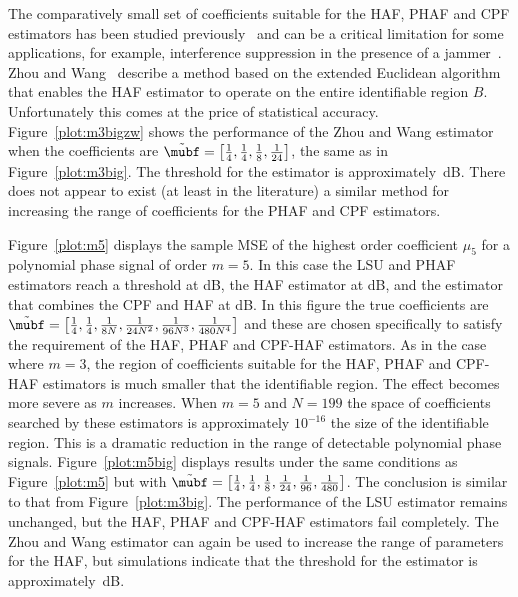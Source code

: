 \documentclass[journal]{IEEEtran}
\begin{document}
The comparatively small set of coefficients suitable for the HAF, PHAF and CPF estimators has been studied previously~\cite{Angeby_PPS_aliasing_2000,Djurovic_aliasing_2012,McKilliam2009IndentifiabliltyAliasingPolyphase,Zhou_lag_diverity_PPT_1997,Xia_dynamic_range_pps_2001,Morelande_bayes_unwrapping_2009_tsp} and can be a critical limitation for some applications, for example, interference suppression in the presence of a jammer~\cite{Djukanovic:2011:PMN:1950994.1951252,Djurovic_aliasing_2012}.  Zhou and Wang~\cite{Zhou_lag_diverity_PPT_1997} describe a method based on the extended Euclidean algorithm that enables the HAF estimator to operate on the entire identifiable region $B$.  Unfortunately this comes at the price of statistical accuracy.  Figure~\ref{plot:m3bigzw} shows the performance of the Zhou and Wang estimator when the coefficients are $\tilde{\mubf} = \left[ \tfrac{1}{4}, \tfrac{1}{4}, \tfrac{1}{8}, \tfrac{1}{24}  \right]$, the same as in Figure~\ref{plot:m3big}.  The threshold for the estimator is approximately~\unit[28]{dB}.  There does not appear to exist (at least in the literature) a similar method for increasing the range of coefficients for the PHAF and CPF estimators.

Figure~\ref{plot:m5} displays the sample MSE of the highest order coefficient $\mu_5$  for a polynomial phase signal of order $m=5$.  In this case the LSU and PHAF estimators reach a threshold at \unit[12]{dB}, the HAF estimator at \unit[18]{dB}, and the estimator that combines the CPF and HAF at \unit[10]{dB}.  In this figure the true coefficients are $\tilde{\mubf} = \left[ \tfrac{1}{4}, \tfrac{1}{4}, \tfrac{1}{8N}, \tfrac{1}{24N^2}, \tfrac{1}{96N^3}, \tfrac{1}{480N^4}  \right]$ and these are chosen specifically to satisfy the requirement of the HAF, PHAF and CPF-HAF estimators.  As in the case where $m=3$, the region of coefficients suitable for the HAF, PHAF and CPF-HAF estimators is much smaller that the identifiable region.  The effect becomes more severe as $m$ increases.  When $m=5$ and $N=199$ the space of coefficients searched by these estimators is approximately $10^{-16}$ the size of the identifiable region.  This is a dramatic reduction in the range of detectable polynomial phase signals. Figure~\ref{plot:m5big} displays results under the same conditions as Figure~\ref{plot:m5} but with $\tilde{\mubf} = \left[ \tfrac{1}{4}, \tfrac{1}{4}, \tfrac{1}{8}, \tfrac{1}{24}, \tfrac{1}{96}, \tfrac{1}{480}  \right]$.  The conclusion is similar to that from Figure~\ref{plot:m3big}.  The performance of the LSU estimator remains unchanged, but the HAF, PHAF and CPF-HAF estimators fail completely.  The Zhou and Wang estimator can again be used to increase the range of parameters for the HAF, but simulations indicate that the threshold for the estimator is approximately~\unit[103]{dB}.  
\end{document}
